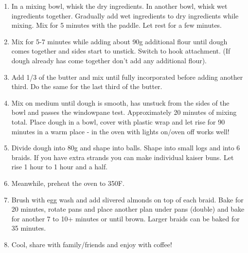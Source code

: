 \begin{enumerate}
    \item In a mixing bowl, whisk the dry ingredients. In another bowl, whisk wet ingredients together. Gradually add wet ingredients to dry ingredients while mixing. Mix for 5 minutes with the paddle. Let rest for a few minutes.
    \item Mix for 5-7 minutes while adding about 90g additional flour until dough comes together and sides start to unstick. Switch to hook attachment. (If dough already has come together don't add any additional flour).
    \item Add 1/3 of the butter and mix until fully incorporated before adding another third. Do the same for the last third of the butter.
    \item Mix on medium until dough is smooth, has unstuck from the sides of the bowl and passes the windowpane test. Approximately 20 minutes of mixing total. Place dough in a bowl, cover with plastic wrap and let rise for 90 minutes in a warm place - in the oven with lights on/oven off works well!
    \item Divide dough into 80g and shape into balls. Shape into small logs and into 6 braids. If you have extra strands you can make individual kaiser buns. Let rise 1 hour to 1 hour and a half.
    \item Meanwhile, preheat the oven to 350\degree F.
    \item Brush with egg wash and add slivered almonds on top of each braid. Bake for 20 minutes, rotate pans and place another plan under pans (double) and bake for another 7 to 10+ minutes or until brown. Larger braids can be baked for 35 minutes.
    \item Cool, share with family/friends and enjoy with coffee!
\end{enumerate}


